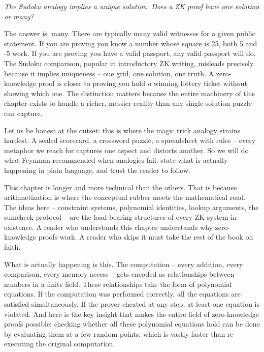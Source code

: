 \documentclass[
  11pt,
  openany]{report}
\begin{document}
\par\vspace{18pt}

\emph{The Sudoku analogy implies a unique solution. Does a ZK proof have one
solution or many?}

The answer is: many. There are typically many valid witnesses for a given public
statement. If you are proving you know a number whose square is 25, both 5 and
-5 work. If you are proving you have a valid passport, any valid passport will
do. The Sudoku comparison, popular in introductory ZK writing, misleads
precisely because it implies uniqueness -- one grid, one solution, one truth. A
zero-knowledge proof is closer to proving you hold \emph{a} winning lottery
ticket without showing which one. The distinction matters because the entire
machinery of this chapter exists to handle a richer, messier reality than any
single-solution puzzle can capture.

\par\vspace{18pt}

Let us be honest at the outset: this is where the magic trick analogy strains
hardest. A sealed scorecard, a crossword puzzle, a spreadsheet with rules --
every metaphor we reach for captures one aspect and distorts another. So we will
do what Feynman recommended when analogies fail: state what is actually
happening in plain language, and trust the reader to follow.

This chapter is longer and more technical than the others. That is because
arithmetization is where the conceptual rubber meets the mathematical road. The
ideas here -- constraint systems, polynomial identities, lookup arguments, the
sumcheck protocol -- are the load-bearing structures of every ZK system in
existence. A reader who understands this chapter understands why zero-knowledge
proofs work. A reader who skips it must take the rest of the book on faith.

What is actually happening is this. The computation -- every addition, every
comparison, every memory access -- gets encoded as relationships between numbers
in a finite field. These relationships take the form of polynomial equations. If
the computation was performed correctly, all the equations are satisfied
simultaneously. If the prover cheated at any step, at least one equation is
violated. And here is the key insight that makes the entire field of
zero-knowledge proofs possible: checking whether all these polynomial equations
hold can be done by evaluating them at a few random points, which is vastly
faster than re-executing the original computation.
\end{document}
